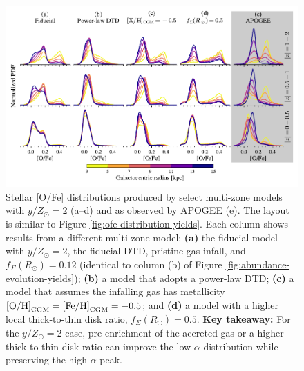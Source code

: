 \documentclass[twocolumn,twocolappendix,linenumbers]{aastex631}
\newcommand{\mathOH}{{\rm [O/H]}}
\newcommand{\mathFeH}{{\rm [Fe/H]}}
\newcommand{\yZ}[1]{$y/Z_\odot=#1$}
\begin{document}
\begin{figure}
    \centering
    \includegraphics[width=\textwidth]{src/tex/figures/ofe_distribution_params.pdf}
    \caption{Stellar [O/Fe] distributions produced by select multi-zone models with \yZ{2} (a--d) and as observed by APOGEE (e). The layout is similar to Figure \ref{fig:ofe-distribution-yields}. Each column shows results from a different multi-zone model: {\bf (a)} the fiducial model with \yZ{2}, the fiducial DTD, pristine gas infall, and $f_\Sigma(R_\odot)=0.12$ (identical to column (b) of Figure \ref{fig:abundance-evolution-yields}); {\bf (b)} a model that adopts a power-law DTD; {\bf (c)} a model that assumes the infalling gas has metallicity $\mathOH_{\rm CGM}=\mathFeH_{\rm CGM}=-0.5$; and {\bf (d)} a model with a higher local thick-to-thin disk ratio, $f_\Sigma(R_\odot)=0.5$. {\bf Key takeaway:} For the \yZ{2} case, pre-enrichment of the accreted gas or a higher thick-to-thin disk ratio can improve the low-$\alpha$ distribution while preserving the high-$\alpha$ peak.}
    \label{fig:ofe-distribution-parameters}
\end{figure}
\end{document}

